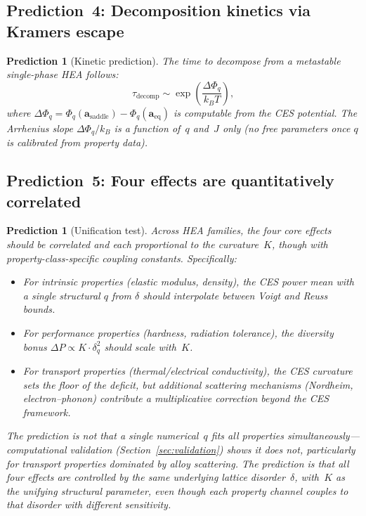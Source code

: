 \documentclass[12pt,letterpaper]{article}
\newtheorem{prediction}[theorem]{Prediction}
\theoremstyle{definition}
\begin{document}
\subsection{Prediction~4: Decomposition kinetics via Kramers escape}

\begin{prediction}[Kinetic prediction]\label{pred:kramers}
The time to decompose from a metastable single-phase HEA follows:
\begin{equation}
  \tau_{\mathrm{decomp}} \sim \exp\left(\frac{\Delta\Phi_q}{k_B T}\right),
\end{equation}
where $\Delta\Phi_q = \Phi_q(\mathbf{a}_{\mathrm{saddle}}) - \Phi_q(\mathbf{a}_{\mathrm{eq}})$ is computable from the CES potential.  The Arrhenius slope $\Delta\Phi_q / k_B$ is a function of~$q$ and~$J$ only (no free parameters once $q$ is calibrated from property data).
\end{prediction}

\subsection{Prediction~5: Four effects are quantitatively correlated}

\begin{prediction}[Unification test]\label{pred:unification}
Across HEA families, the four core effects should be \emph{correlated} and each proportional to the curvature~$K$, though with property-class-specific coupling constants.  Specifically:
\begin{itemize}
  \item For \emph{intrinsic properties} (elastic modulus, density), the CES power mean with a single structural $q$ from $\delta$ should interpolate between Voigt and Reuss bounds.
  \item For \emph{performance properties} (hardness, radiation tolerance), the diversity bonus $\Delta P \propto K \cdot \delta_q^2$ should scale with~$K$.
  \item For \emph{transport properties} (thermal/electrical conductivity), the CES curvature sets the \emph{floor} of the deficit, but additional scattering mechanisms (Nordheim, electron--phonon) contribute a multiplicative correction beyond the CES framework.
\end{itemize}
The prediction is not that a single numerical~$q$ fits all properties simultaneously---computational validation (Section~\ref{sec:validation}) shows it does not, particularly for transport properties dominated by alloy scattering.  The prediction is that all four effects are \emph{controlled by the same underlying lattice disorder}~$\delta$, with~$K$ as the unifying structural parameter, even though each property channel couples to that disorder with different sensitivity.
\end{prediction}
\end{document}
